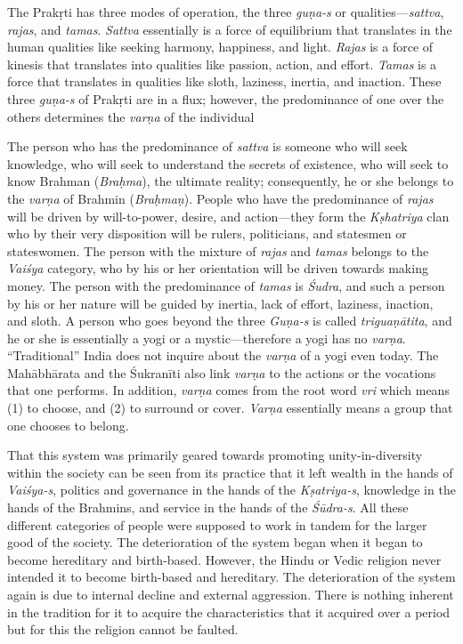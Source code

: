 The Prakṛti  has three modes of operation, the three \textit{guṇa-s} or qualities—\textit{sattva},  \textit{rajas},   and \textit{tamas}. \textit{Sattva} essentially is a force of equilibrium that translates in the human qualities like seeking harmony, happiness, and light. \textit{Rajas} is a force of kinesis that translates into qualities like passion, action, and effort. \textit{Tamas} is a force that translates in qualities like sloth, laziness, inertia, and inaction. These three \textit{guṇa-s} of Prakṛti  are in a flux; however, the predominance of one over the others determines the \textit{varṇa} of the individual


The person who has the predominance of \textit{sattva} is someone who will seek knowledge, who will seek to understand the secrets of existence, who will seek to know Brahman (\textit{Braḥma}), the ultimate reality; consequently, he or she belongs to the \textit{varṇa} of Brahmin (\textit{Braḥmaṇ}). People who have the predominance of \textit{rajas} will be driven by will-to-power, desire, and action—they form the \textit{Kṣhatriya} clan who by their very disposition will be rulers, politicians, and statesmen or stateswomen. The person with the mixture of \textit{rajas} and \textit{tamas} belongs to the \textit{Vaiśya} category, who by his or her orientation will be driven towards making money. The person with the predominance of \textit{tamas} is \textit{Śudra},  and such a person by his or her nature will be guided by inertia, lack of effort, laziness, inaction, and sloth. A person who goes beyond the three \textit{Guṇa-s} is called \textit{triguaṇātita},  and he or she is essentially a yogi or a mystic—therefore a yogi has no \textit{varṇa}. “Traditional” India does not inquire about the \textit{varṇa} of a yogi even today. The Mahābhārata and the Śukranīti also link \textit{varṇa} to the actions or the vocations that one performs. In addition, \textit{varṇa} comes from the root word \textit{vri} which means (1) to choose, and (2) to surround or cover. \textit{Varṇa} essentially means a group that one chooses to belong.

That this system was primarily geared towards promoting unity-in-diversity within the society can be seen from its practice that it left wealth in the hands of \textit{Vaiśya-s},  politics and governance in the hands of the \textit{Kṣatriya-s},  knowledge in the hands of the Brahmins, and service in the hands of the \textit{Śūdra-s}. All these different categories of people were supposed to work in tandem for the larger good of the society. The deterioration of the system began when it began to become hereditary and birth-based. However, the Hindu or Vedic religion never intended it to become birth-based and hereditary. The deterioration of the system again is due to internal decline and external aggression. There is nothing inherent in the tradition for it to acquire the characteristics that it acquired over a period but for this the religion cannot be faulted.
\eject

